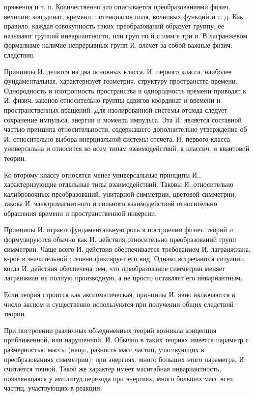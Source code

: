 \documentclass[10pt]{article}
\begin{document}
пряжения и т. п. Количественно это описывается преобразованиями физич. величин: координат, времени, потенциалов поля, волновых функций и т. д. Как правило, каждая совокупность таких преобразований образует группу; ее называют группой инвариантности, или груп по й с имм е три и. В лагранжевом формализме наличие непрерывных групп И. влечет за собой важные физич. следствия.



Принципы И. делятся на два основных класса. И. первого класса, наиболее фундаментальная, характеризует геометрич. структуру пространства-времени. Однородность и изотропность пространства и однородность времени приводят к И. физич. законов относительно группы сдвигов координат и времени и пространственных вращений. Для изолированной системы отсюда следует сохранение импульса, энергии и момента импульса. Эта И. является составной частью принципа относительности, содержашего дополнительно утверждение об И. относительно выбора инерциальной системы отсчета. И. первого класса универсальна и относится ко всем типам взаимодействий, к классич. и квантовой теории.



Ко второму классу относятся менее универсальные принципы И., характеризующие отдельные типы взаимодействий. Таковы И. относительно калибровочных преобразований, унитарной симметрии, цветовой симметрии; такова И. электромагнитного и сильного взаимодействий относительно обрашения времени и пространственной инверсии.



Принципы И. играют фундаментальную роль в построении физич. теорий и формулируются обычно как И. действия относительно преобразований групп симметрии. Чаще всего И. действия обеспечивается требованием И. лагранжиана, к-рое в значительной степени фиксирует его вид. Однако встречаются ситуации, когда И. действия обеспечена тем, что преобразование симметрии меняет лагранжиан на полную производную, а не просто оставляет его инвариантным.



Если теория строится как аксиоматическая, принципы И. явно включаются в число аксиом и существенно используются при получении общих следствий теории.



При построении различных объединенных теорий возникла концепция приближенной, или нарушенной, И. Обычно в таких теориях имеется параметр с размерностью массы (напр., разность масс частиц, участвующих в преобразованиях симметрии); при энергиях, много больших этого параметра, И. считается точной. Такой же характер имеет маситабная инвариантность, появляющаяся у амплитуд перехода при энергиях, много больших масс всех частиц, участвующих в реакции.
\end{document}
